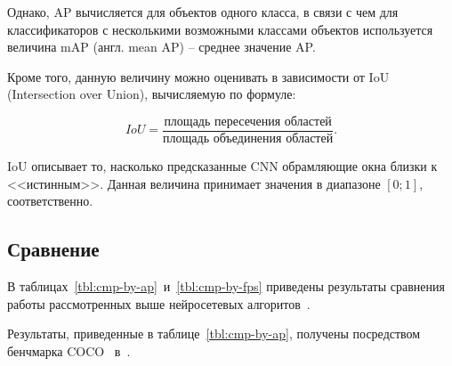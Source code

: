 Однако, AP вычисляется для объектов одного класса, в связи с чем для классификаторов с несколькими возможными классами объектов используется величина mAP (англ. mean AP) -- среднее значение AP.

Кроме того, данную величину можно оценивать в зависимости от IoU (Intersection over Union), вычисляемую по формуле:

\begin{equation}
	IoU = \frac{\text{площадь пересечения областей}}{\text{площадь объединения областей}}.
\end{equation}

IoU описывает то, насколько предсказанные CNN обрамляющие окна близки к <<истинным>>. Данная величина принимает значения в диапазоне $[0;1]$, соответственно.

\subsection{Сравнение}

В таблицах~\ref{tbl:cmp-by-ap}~и~\ref{tbl:cmp-by-fps} приведены результаты сравнения работы рассмотренных выше нейросетевых алгоритов~\cite{yolov3}. 

Результаты, приведенные в таблице~\ref{tbl:cmp-by-ap}, получены посредством бенчмарка COCO~\cite{coco-benchmark} в~\cite{yolov3}.

